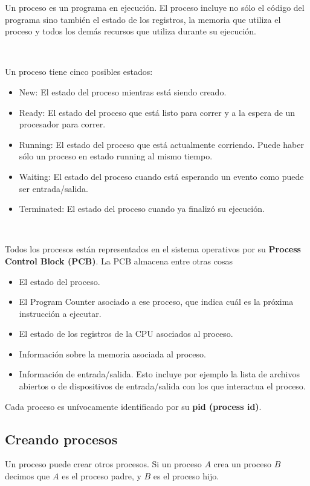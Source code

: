 \documentclass{article}
\begin{document}
Un proceso es un programa en ejecuci\'on. El proceso incluye no s\'olo el c\'odigo del programa sino tambi\'en el estado de los registros, la memoria que utiliza el proceso y todos los dem\'as recursos que utiliza durante su ejecuci\'on.

~

Un proceso tiene cinco posibles estados:
\begin{itemize}
\item New: El estado del proceso mientras est\'a siendo creado.
\item Ready: El estado del proceso que est\'a listo para correr y a la espera de un procesador para correr.
\item Running: El estado del proceso que est\'a actualmente corriendo. Puede haber s\'olo un proceso en estado running al mismo tiempo.
\item Waiting: El estado del proceso cuando est\'a esperando un evento como puede ser entrada/salida.
\item Terminated: El estado del proceso cuando ya finaliz\'o su ejecuci\'on.
\end{itemize}

~

Todos los procesos est\'an representados en el sistema operativos por su \textbf{Process Control Block (PCB)}. La PCB almacena entre otras cosas
\begin{itemize}
\item El estado del proceso.
\item El Program Counter asociado a ese proceso, que indica cu\'al es la pr\'oxima instrucci\'on a ejecutar.
\item El estado de los registros de la CPU asociados al proceso.
\item Informaci\'on sobre la memoria asociada al proceso.
\item Informaci\'on de entrada/salida. Esto incluye por ejemplo la lista de archivos abiertos o de dispositivos de entrada/salida con los que interactua el proceso.
\end{itemize}

Cada proceso es un\'ivocamente identificado por su \textbf{pid (process id)}.

\subsection{Creando procesos}

Un proceso puede crear otros procesos. Si un proceso $A$ crea un proceso $B$ decimos que $A$ es el proceso padre, y $B$ es el proceso hijo.
\end{document}
